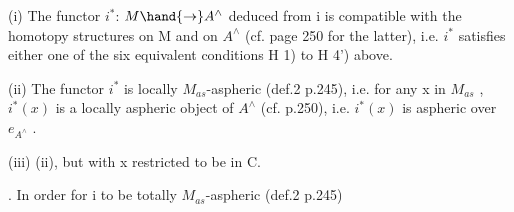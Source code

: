 (i) The functor $i^{*}$: $M \hand{\to} A^{\wedge}$ deduced from i is compatible with the
homotopy structures on M and on $A^{\wedge}$ (cf. page 250 for the latter), i.e.
$i^{*}$ satisfies ei\hand{$\downarrow$}ther one of the six equivalent conditions H 1) to H 4')
above.

(ii) The functor $i^{*}$ is locally $M_{as}$-aspheric (def.2 p.245), i.e.
for any x in $M_{as}$ , $i^{*}(x)$ is a locally aspheric object of $A^{\wedge}$ (cf. p.250),
i.e. $i^{*}(x)$ is aspheric over $e_{A^{\wedge}}$ .

(iii)  (ii), but with x restricted to be in C.

\hand{\uline{\textcolor{black}{Corollary 1}}} . In order for i to be totally $M_{as}$-aspheric (def.2 p.245)

